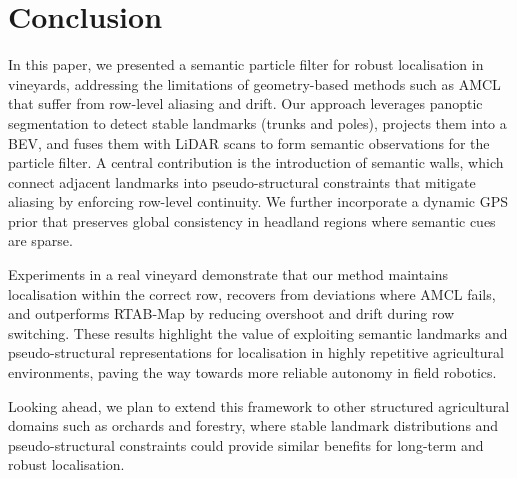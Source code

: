 \documentclass[letterpaper, 10 pt, conference]{ieeeconf}
\begin{document}
\section{Conclusion}
\label{sec:conclusion}

In this paper, we presented a semantic particle filter for robust localisation in vineyards, addressing the limitations of geometry-based methods such as AMCL that suffer from row-level aliasing and drift. Our approach leverages panoptic segmentation to detect stable landmarks (trunks and poles), projects them into a BEV, and fuses them with LiDAR scans to form semantic observations for the particle filter. A central contribution is the introduction of semantic walls, which connect adjacent landmarks into pseudo-structural constraints that mitigate aliasing by enforcing row-level continuity. We further incorporate a dynamic GPS prior that preserves global consistency in headland regions where semantic cues are sparse.

Experiments in a real vineyard demonstrate that our method maintains localisation within the correct row, recovers from deviations where AMCL fails, and outperforms RTAB-Map by reducing overshoot and drift during row switching. These results highlight the value of exploiting semantic landmarks and pseudo-structural representations for localisation in highly repetitive agricultural environments, paving the way towards more reliable autonomy in field robotics.

Looking ahead, we plan to extend this framework to other structured agricultural domains such as orchards and forestry, where stable landmark distributions and pseudo-structural constraints could provide similar benefits for long-term and robust localisation.







\end{document}

